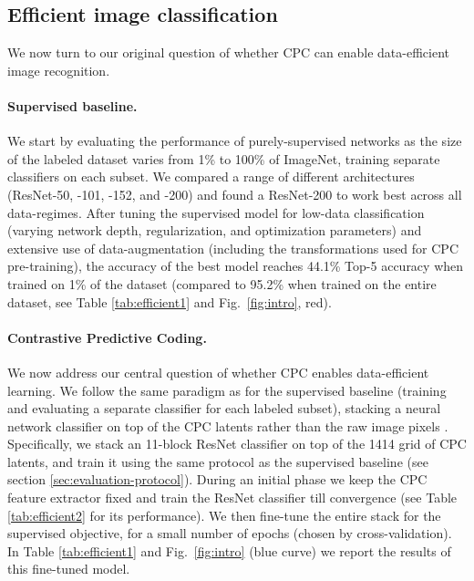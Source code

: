 \documentclass{article}
\begin{document}
\subsection{Efficient image classification}
\label{sec:experiments-efficient}
We now turn to our original question of whether CPC can enable data-efficient image recognition. 

\paragraph{Supervised baseline.} We start by evaluating the performance of purely-supervised networks as the size of the labeled dataset  varies from 1\% to 100\% of ImageNet, training separate classifiers on each subset. We compared a range of different architectures (ResNet-50, -101, -152, and -200) and found a ResNet-200 to work best across all data-regimes. After tuning the supervised model for low-data classification (varying network depth, regularization, and optimization parameters) and extensive use of data-augmentation (including the transformations used for CPC pre-training), the accuracy of the best model reaches 44.1\% Top-5 accuracy when trained on 1\% of the dataset (compared to 95.2\% when trained on the entire dataset, see Table \ref{tab:efficient1} and Fig.\ \ref{fig:intro}, red).

\paragraph{Contrastive Predictive Coding.} We now address our central question of whether CPC enables data-efficient learning. We follow the same paradigm as for the supervised baseline (training and evaluating a separate classifier for each labeled subset), stacking a neural network classifier on top of the CPC latents  rather than the raw image pixels . Specifically, we stack an 11-block ResNet classifier  on top of the 1414 grid of CPC latents, and train it using the same protocol as the supervised baseline (see section \ref{sec:evaluation-protocol}). During an initial phase we keep the CPC feature extractor fixed and train the ResNet classifier till convergence (see Table \ref{tab:efficient2} for its performance). We then fine-tune the entire stack  for the supervised objective, for a small number of epochs (chosen by cross-validation). In Table \ref{tab:efficient1} and Fig.\ \ref{fig:intro} (blue curve) we report the results of this fine-tuned model. 
\end{document}
